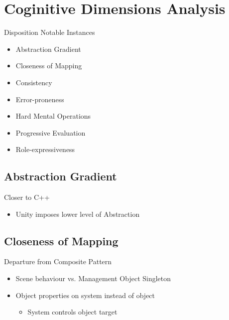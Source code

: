 \section{Coginitive Dimensions Analysis}
\begin{frame}{\secname}{Disposition}
	Notable Instances
	\begin{itemize}
		\item Abstraction Gradient
		\item Closeness of Mapping
		\item Consistency
		\item Error-proneness
		\item Hard Mental Operations
		\item Progressive Evaluation
		\item Role-expressiveness
	\end{itemize}
\end{frame}

\subsection{Abstraction Gradient}
\begin{frame}{\secname}{\subsecname}
	Closer to C++
	\begin{itemize}
		\item Unity imposes lower level of Abstraction
	\end{itemize}
\end{frame}

\subsection{Closeness of Mapping}
\begin{frame}{\secname}{\subsecname}
	Departure from Composite Pattern
	\begin{itemize}
		\item Scene behaviour vs. Management Object Singleton
		\item Object properties on system instead of object
		\begin{itemize}
			\item System controls object target
		\end{itemize}
	\end{itemize}
\end{frame}

